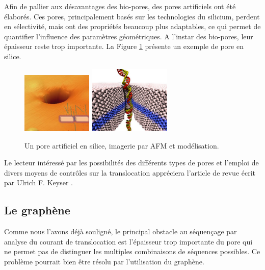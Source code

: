 \documentclass[a4paper,11pt]{article}
\begin{document}
Afin de pallier aux désavantages des bio-pores, des pores artificiels ont été élaborés. Ces pores, principalement basés sur les technologies du silicium, perdent en sélectivité, mais ont des propriétés beaucoup plus adaptables, ce qui permet de quantifier l'influence des paramètres géométriques. A l'instar des bio-pores, leur épaisseur reste trop importante. La Figure \ref{artificialpore} présente un exemple de pore en silice.

\begin{figure}[H]
\begin{center}
\includegraphics[width=0.3\textwidth]{artificialpore.png} \hspace{0.02\textwidth}
\includegraphics[width=0.35\textwidth]{nanoporeart.jpg}

\caption{Un pore artificiel en silice, imagerie par AFM et modélisation.}
\label{artificialpore}
\end{center}
\end{figure}

Le lecteur intéressé par les possibilités des différents types de pores et l'emploi de divers moyens de contrôles sur la translocation appréciera l'article de revue écrit par Ulrich F. Keyser \cite{keyser}. 




\subsection{Le graphène}

Comme nous l'avons déjà souligné, le principal obstacle au séquençage par analyse du courant de translocation est l'épaisseur trop importante du pore qui ne permet pas de distinguer les multiples combinaisons de séquences possibles. Ce problème pourrait bien être résolu par l'utilisation du graphène.\\
\end{document}
